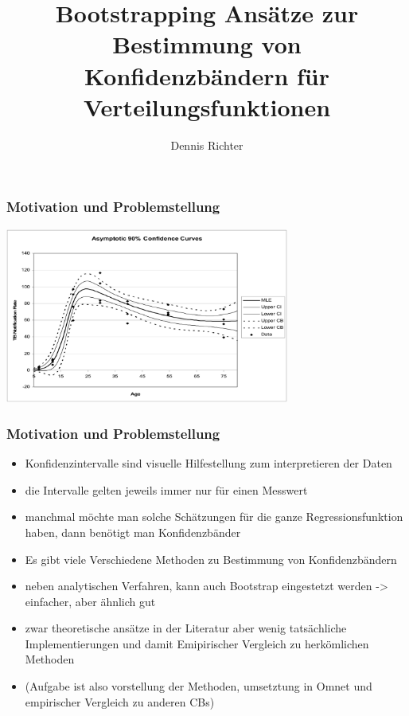 \documentclass[aspectratio=1610, 9pt]{beamer}
\title{Bootstrapping Ansätze zur Bestimmung von Konfidenzbändern für Verteilungsfunktionen}
\author[D.~Richter]{Dennis Richter}
\institute[LS 4]{Lehrstuhl IV \\ Informatik}
\begin{document}
\maketitle

\begin{frame}
  \frametitle{Motivation und Problemstellung}
  \begin{center}
    \includegraphics[width=0.7\textwidth]{images/4.png}
  \end{center}
\end{frame}

\begin{frame}
  \frametitle{Motivation und Problemstellung}
  \begin{itemize}
    \item Konfidenzintervalle sind visuelle Hilfestellung zum interpretieren der Daten
    \item die Intervalle gelten jeweils immer nur für einen Messwert
    \item manchmal möchte man solche Schätzungen für die ganze Regressionsfunktion haben, dann benötigt man Konfidenzbänder
    \item Es gibt viele Verschiedene Methoden zu Bestimmung von Konfidenzbändern
    \item neben analytischen Verfahren, kann auch Bootstrap eingestetzt werden -> einfacher, aber ähnlich gut
    \item zwar theoretische ansätze in der Literatur aber wenig tatsächliche Implementierungen und damit Emipirischer Vergleich zu herkömlichen Methoden
    \item (Aufgabe ist also vorstellung der Methoden, umsetztung in Omnet und empirischer Vergleich zu anderen CBs)
  \end{itemize}
\end{frame}
\end{document}
